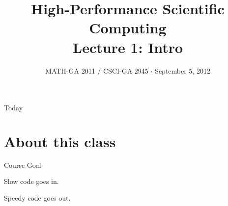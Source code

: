 \documentclass[english,compress]{beamer}
\begin{document}

\title{High-Performance Scientific Computing\\Lecture 1: Intro}

\date{MATH-GA 2011 / CSCI-GA 2945 $\cdot$ September 5, 2012}

\frame{\titlepage}

\begin{frame}{Today}
  \tableofcontents[hideallsubsections]
\end{frame}
\section{About this class}
\begin{frame}{Course Goal}

  \begin{center}
    \Large
    Slow code goes in.

    \Huge
    Speedy code goes out.
  \end{center}
\end{frame}
\end{document}
